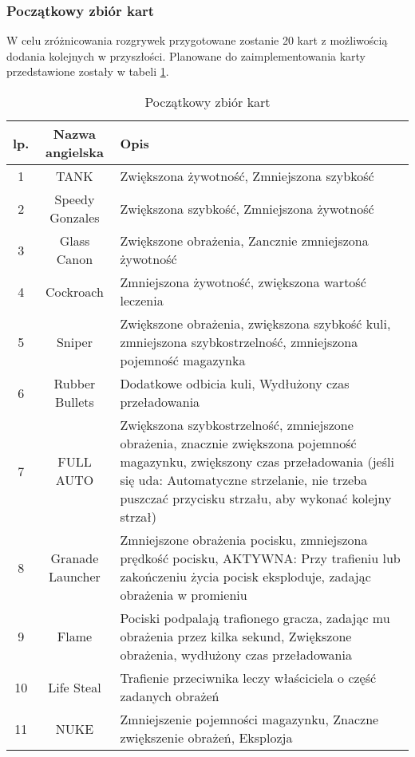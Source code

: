 \subsubsection*{Początkowy zbiór kart}
W celu zróżnicowania rozgrywek przygotowane zostanie 20 kart z możliwością dodania kolejnych w przyszłości. Planowane do zaimplementowania karty przedstawione zostały w tabeli \ref{tab:cards}.

\begin{table}
    \small
    \centering
    \caption{Początkowy zbiór kart}
    \label{tab:cards}
    \begin{tabularx}{\linewidth}{|c|c|X|}
        \hline
        lp. & Nazwa angielska & Opis\\
        \hline \hline
        1   & TANK & Zwiększona żywotność, Zmniejszona szybkość \\
        \hline 
        2   & Speedy Gonzales & Zwiększona szybkość, Zmniejszona żywotność \\
        \hline 
        3   & Glass Canon & Zwiększone obrażenia, Zancznie zmniejszona żywotność \\
        \hline 
        4   & Cockroach & Zmniejszona żywotność, zwiększona wartość leczenia \\
        \hline 
        5   & Sniper & Zwiększone obrażenia, zwiększona szybkość kuli, zmniejszona szybkostrzelność, zmniejszona pojemność magazynka \\
        \hline 
        6   & Rubber Bullets & Dodatkowe odbicia kuli, Wydłużony czas przeładowania\\
        \hline 
        7   & FULL AUTO & Zwiększona szybkostrzelność, zmniejszone obrażenia, znacznie zwiększona pojemność magazynku, zwiększony czas przeładowania (jeśli się uda: Automatyczne strzelanie, nie trzeba puszczać przycisku strzału, aby wykonać kolejny strzał) \\
        \hline 
        8   & Granade Launcher & Zmniejszone obrażenia pocisku, zmniejszona prędkość pocisku, AKTYWNA: Przy trafieniu lub zakończeniu życia pocisk eksploduje, zadając obrażenia w promieniu \\
        \hline 
        9   & Flame & Pociski podpalają trafionego gracza, zadając mu obrażenia przez kilka sekund, Zwiększone obrażenia, wydłużony czas przeładowania \\
        \hline 
        10  & Life Steal & Trafienie przeciwnika leczy właściciela o część zadanych obrażeń  \\
        \hline 
        11  & NUKE & Zmniejszenie pojemności magazynku, Znaczne zwiększenie obrażeń, Eksplozja\\

\end{tabularx}
\end{table}

